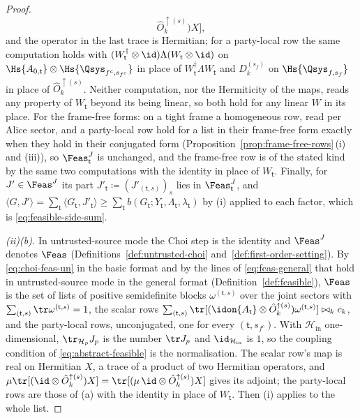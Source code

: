 \begin{proof}
\begin{equation*}
  \hat O^{\uparrow(s)}_k\big)X\big],
\end{equation*}
and the operator in the last trace is Hermitian; for a party-local row the
same computation holds with $(W_{\mathsf t}^{\dagger}\otimes\id)\Lambda
(W_{\mathsf t}\otimes\id)$ on $\Hs{A_{0,\mathsf t}}\otimes
\Hs{\Qsys_{f^c,s_{f^c}}}$ in place of $W_{\mathsf t}^{\dagger}\Lambda
W_{\mathsf t}$ and $D^{(s_f)}_k$ on $\Hs{\Qsys_{f,s_f}}$ in place of
$\hat O^{\uparrow(s)}_k$. Neither computation, nor the Hermiticity of the
maps, reads any property of $W_{\mathsf t}$ beyond its being linear, so
both hold for any linear $W$ in its place. For the frame-free forms: on a tight frame a
homogeneous row, read per Alice sector, and a party-local row hold for a
list in their frame-free form exactly when they hold in their conjugated
form (Proposition~\ref{prop:frame-free-rows}\,(i) and (iii)), so
$\Feas^{J}_{\mathsf t}$ is unchanged, and the frame-free row is of the
stated kind by the same two computations with the identity in place of
$W_{\mathsf t}$. Finally, for $J'\in\Feas^{J}$ its part
$J'_{\mathsf t}\coloneqq(J'_{(\mathsf t,s)})_s$ lies in
$\Feas^{J}_{\mathsf t}$, and
$\langle G,J'\rangle=\sum_{\mathsf t}\langle G_{\mathsf t},J'_{\mathsf t}\rangle
\ge\sum_{\mathsf t}b(G_{\mathsf t};Y_{\mathsf t},\Lambda_{\mathsf t},
\lambda_{\mathsf t})$ by (i) applied to each factor, which is
\eqref{eq:feasible-side-sum}.

\emph{(ii)(b).} In untrusted-source mode the Choi step is the identity and
$\Feas^{J}$ denotes $\Feas$ (Definitions~\ref{def:untrusted-choi}
and~\ref{def:first-order-setting}). By \eqref{eq:choi-feas-un} in the basic
format and by the lines of \eqref{eq:feas-general} that hold in
untrusted-source mode in the general format (Definition~\ref{def:feasible}),
$\Feas$ is the set of lists of positive semidefinite blocks
$\omega^{(\mathsf t,s)}$ over the joint sectors with
$\sum_{(\mathsf t,s)}\tr\omega^{(\mathsf t,s)}=1$, the scalar rows
$\sum_{(\mathsf t,s)}\tr[(\idon{A_{\mathsf t}}\otimes
\hat O^{\uparrow(s)}_k)\omega^{(\mathsf t,s)}]\bowtie_kc_k$, and the
party-local rows, unconjugated, one for every $(\mathsf t,s_{f^c})$. With
$\mathcal{H}_{\mathrm{in}}$ one-dimensional, $\tr_{\mathcal{H}_p}J_p$ is the
number $\tr J_p$ and $\id_{\mathcal{H}_{\mathrm{in}}}$ is $1$, so the
coupling condition of \eqref{eq:abstract-feasible} is the normalisation.
The scalar row's map is real on Hermitian $X$, a trace of a product of two
Hermitian operators, and
$\mu\tr[(\id\otimes\hat O^{\uparrow(s)}_k)X]
=\tr[(\mu\,\id\otimes\hat O^{\uparrow(s)}_k)X]$ gives its adjoint; the
party-local rows are those of (a) with the identity in place of
$W_{\mathsf t}$. Then (i) applies to the whole list.


\end{proof}

